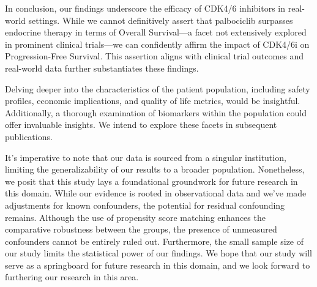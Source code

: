 In conclusion, our findings underscore the efficacy of CDK4/6 inhibitors in real-world settings. While we cannot definitively assert that palbociclib surpasses endocrine therapy in terms of Overall Survival—a facet not extensively explored in prominent clinical trials—we can confidently affirm the impact of CDK4/6i on Progression-Free Survival. This assertion aligns with clinical trial outcomes and real-world data further substantiates these findings.

Delving deeper into the characteristics of the patient population, including safety profiles, economic implications, and quality of life metrics, would be insightful. Additionally, a thorough examination of biomarkers within the population could offer invaluable insights. We intend to explore these facets in subsequent publications.

It's imperative to note that our data is sourced from a singular institution, limiting the generalizability of our results to a broader population. Nonetheless, we posit that this study lays a foundational groundwork for future research in this domain. While our evidence is rooted in observational data and we've made adjustments for known confounders, the potential for residual confounding remains. Although the use of propensity score matching enhances the comparative robustness between the groups, the presence of unmeasured confounders cannot be entirely ruled out. Furthermore, the small sample size of our study limits the statistical power of our findings. We hope that our study will serve as a springboard for future research in this domain, and we look forward to furthering our research in this area.
